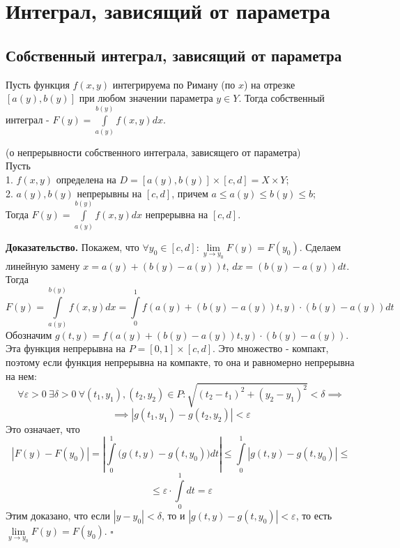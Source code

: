 \chapter{Интеграл, зависящий от параметра}
\section{Собственный интеграл, зависящий от параметра}
\begin{defin}
    Пусть функция $f(x,y)$ интегрируема по Риману (по $x$) 
    на отрезке $[a(y),b(y)]$
    при любом значении параметра  $y\in Y$. Тогда собственный интеграл - 
    $F(y)=\int\limits_{a(y)}^{b(y)}f(x,y)dx$.
\end{defin}

\begin{theor}
    (о непрерывности собственного интеграла, зависящего от параметра)\\
    Пусть\\
    1. $f(x,y)$ определена на  $D=[a(y),b(y)]\times [c,d]=X\times Y$;\\
    2. $a(y),b(y)$ непрерывны на  $[c,d]$, причем
    $a\leqslant a(y)\leqslant b(y)\leqslant b$;\\
    Тогда $F(y)=\int\limits_{a(y)}^{b(y)}f(x,y)dx$ непрерывна на $[c,d]$.
\end{theor}
\textbf{Доказательство.} Покажем, что $\forall y_0\in [c,d]:
\lim\limits_{y \to y_0}F(y)=F(y_0)$. Сделаем линейную замену
$x=a(y)+(b(y)-a(y))t$, $dx=(b(y)-a(y))dt$. Тогда
$$F(y)=\int\limits_{a(y)}^{b(y)}f(x,y)dx=\int\limits_{0}^{1}
f(a(y)+(b(y)-a(y))t,y)\cdot (b(y)-a(y))dt$$
Обозначим $g(t,y)=f(a(y)+(b(y)-a(y))t,y)\cdot (b(y)-a(y))$. Эта функция 
непрерывна на $P=[0,1]\times [c,d]$. Это множество - компакт, поэтому если 
функция непрерывна на компакте, то она и равномерно непрерывна на нем:
$$\forall \varepsilon>0~\exists \delta>0~\forall (t_1,y_1),(t_2,y_2)\in P:
\sqrt{(t_2-t_1)^2+(y_2-y_1)^2}<\delta\implies $$
$$\implies |g(t_1,y_1)-g(t_2,y_2)|<\varepsilon$$ 
Это означает, что
$$|F(y)-F(y_0)|=\left| \int\limits_{0}^{1}\big(g(t,y)-g(t,y_0)\big)dt\right|
\leqslant \int\limits_{0}^{1}|g(t,y)-g(t,y_0)|\leqslant 
$$
$$\leqslant \varepsilon\cdot \int\limits_{0}^{1}dt=\varepsilon$$
Этим доказано, что если $|y-y_0|<\delta$, то и $|g(t,y)-g(t,y_0)|<
\varepsilon$, то есть $\lim\limits_{y \to y_0}F(y)=F(y_0)$. $\square$ 

